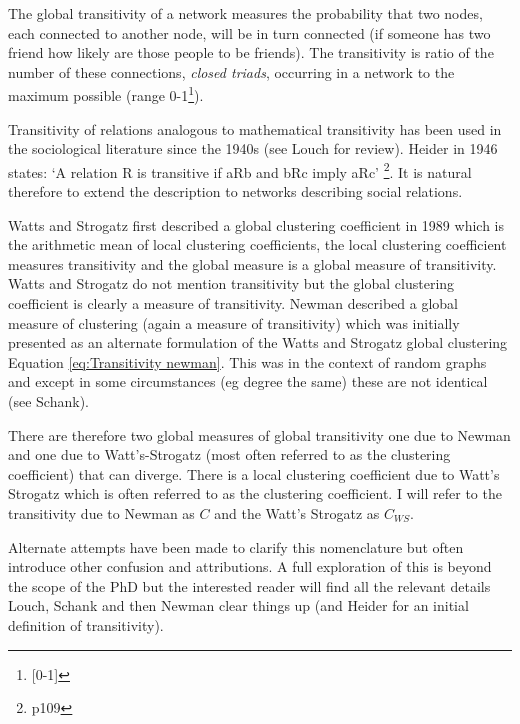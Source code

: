 The global transitivity of a network measures the probability that two nodes, each connected to another node, will be in turn connected (if someone has two friend how likely are those people to be friends). The transitivity is ratio of the number of these connections, \textit{closed triads}, occurring in a network to the maximum possible (range 0-1\footnote{[0-1]}).

Transitivity of relations analogous to mathematical transitivity has been used in the sociological literature since the 1940s\cite{louch2000personal} (see Louch for review). Heider in 1946 states: `A relation R is transitive if aRb and bRc imply aRc' \cite{heider1946attitudes}\footnote{p109}. It is natural therefore to extend the description to networks describing social relations. 

Watts and Strogatz first described a global clustering coefficient in 1989\cite{watts1998collective} which is the arithmetic mean of local clustering coefficients, the local clustering coefficient measures transitivity and the global measure is a global measure of transitivity. Watts and Strogatz do not mention transitivity but the global clustering coefficient is clearly a measure of transitivity. Newman described a global measure of clustering (again a measure of transitivity) which was initially presented as an alternate formulation of the Watts and Strogatz global clustering Equation \ref{eq:Transitivity newman}\cite{newman2002assortative}. This was in the context of random graphs and except in some circumstances (eg degree the same) these are not identical (see Schank\cite{schank2005approximating}).

There are therefore two global measures of global transitivity one due to Newman and one due to Watt's-Strogatz (most often referred to as the clustering coefficient) that can diverge. There is a local clustering coefficient due to Watt's Strogatz which is often referred to as the clustering coefficient. I will refer to the transitivity due to Newman as $C$ and the Watt's Strogatz as $C_{WS}$.

Alternate attempts have been made to clarify this nomenclature \cite{estrada2016local} but often introduce other confusion and attributions. A full exploration of this is beyond the scope of the PhD but the interested reader will find all the relevant details Louch\cite{louch2000personal}, Schank\cite{schank2005approximating} and then Newman \cite{newman2018networks} clear things up (and Heider\cite{heider1946attitudes} for an initial definition of transitivity). 
 

